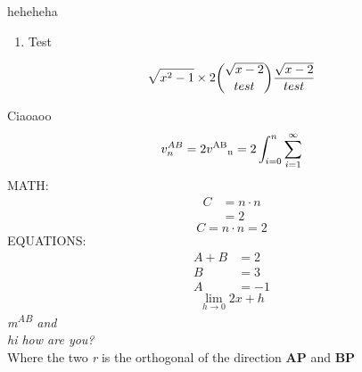 \documentclass{article}
\begin{document}
\newpage
heheheha
\begin{enumerate}
\item Test \
\

\end{enumerate}
\begin{equation} 
\\
\sqrt{x^2-1}
\times 2
\binom{\sqrt{x-2}}{test}
\frac{\sqrt{x-2}}{test}\end{equation}
\begin{wrapfigure}[3\textwidth]{l}{5\textwidth}

\end{wrapfigure}
\begin{figure}[H]
\begin{subfigure}[H]{2\textwidth}

\end{subfigure}

\end{figure}
Ciaoaoo
\begin{equation} 
v^{AB}
_{n}
= 2\\
v
\textsuperscript{AB}
\textsubscript{n}
= 2\\
\int_{i = 0}^{n}
\sum_{i = 1}^{\infty}\end{equation}
MATH:\\
\begin{equation} \label{test}
\begin{split}
C & = n \cdot n\\
& = 2
\end{split}\end{equation}
\begin{equation} 
C = n \cdot n = 2\end{equation}
EQUATIONS:\\
\begin{align*} 
A + B &= 2\\
B &= 3\\
A &= -1\end{align*}
\begin{equation} 
\lim_{h \rightarrow 0
}
2x + h\end{equation}
\textit{m\textsuperscript{AB} and}\\
\textit{hi how are you?}\\
Where the two \textit{r} is the orthogonal of the direction \textbf{AP} and \textbf{BP}
\end{document}
